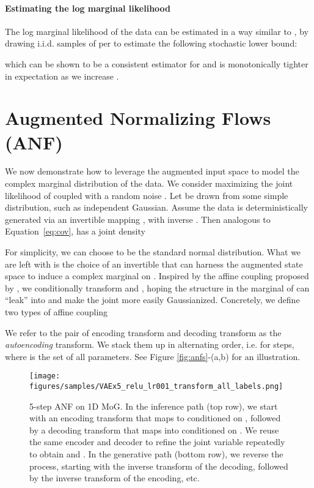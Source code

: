 \documentclass{article}
\begin{document}
\paragraph{Estimating the log marginal likelihood}
The log marginal likelihood  of the data can be estimated in a way similar to \citet{burda2015importance}, by drawing  i.i.d. samples of  per  to estimate the following stochastic lower bound:

which can be shown to be a consistent estimator for  and is monotonically tighter in expectation as we increase . 


\section{Augmented Normalizing Flows (ANF)}
\label{sec:anf}

We now demonstrate how to leverage the augmented input space to model the complex marginal distribution of the data. 
We consider maximizing the joint likelihood of  coupled with a random noise .
Let  be drawn from some simple distribution, such as independent Gaussian. 
Assume the data  is deterministically generated via an invertible mapping , with inverse . 
Then analogous to Equation~\ref{eq:cov},  has a joint density 



For simplicity, we can choose  to be the standard normal distribution. 
What we are left with is the choice of an invertible  that can harness the augmented state space  to induce a complex marginal on . 
Inspired by the affine coupling proposed by \citet{dinh2016density}, we conditionally transform  and , hoping the structure in the marginal of  can ``leak'' into  and make the joint more easily Gaussianized. 
Concretely, we define two types of affine coupling

We refer to the pair of encoding transform and decoding transform as the \emph{autoencoding} transform. 
We stack them up in alternating order, i.e. 
 for  steps, where  is the set of all parameters.
See Figure \ref{fig:anfs}-(a,b) for an illustration.

\begin{figure*}
    \centering
    \texttt{[image: figures/samples/VAEx5\_relu\_lr001\_transform\_all\_labels.png]}
    \caption{\small 5-step ANF on 1D MoG. In the inference path (top row), we start with an encoding transform that maps  to  conditioned on , followed by a decoding transform that maps  into  conditioned on . 
    We reuse the same encoder and decoder to refine the joint variable repeatedly to obtain  and . 
    In the generative path (bottom row), we reverse the process, starting with the inverse transform of the decoding, followed by the inverse transform of the encoding, etc. 
    }
    \label{fig:anf_1d_5}
\end{figure*}
\end{document}
